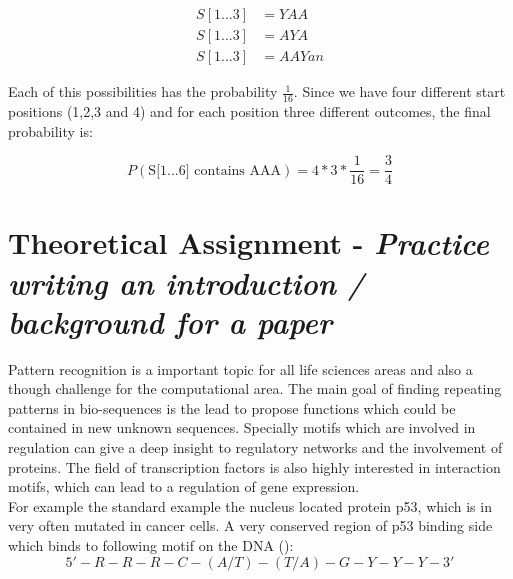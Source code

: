 \documentclass[%
   10pt,              %
   nenglish,           %
   a4paper,           %
   DIV11,             %
]{scrartcl}%
\begin{document}
\begin{align}
 S[1...3] &= YAA \nonumber \\
 S[1...3] &= AYA \nonumber \\
 S[1...3] &= AAY \nonumber an
\end{align}

\noindent Each of this possibilities has the probability $\frac{1}{16}$. Since we have four different 
start positions (1,2,3 and 4) and for each position three different outcomes, the final probability 
is:

\begin{equation}
 P(\textrm{S[1...6] contains AAA}) = 4 * 3 * \frac{1}{16} = \frac{3}{4} \nonumber
\end{equation}



\section*{Theoretical Assignment - \textsl{Practice writing an introduction / background for a paper}}

Pattern recognition is a important topic for all life sciences areas and also a though challenge for the computational area. The main goal of finding repeating patterns in bio-sequences is the lead to propose functions which could be contained in new unknown sequences. Specially motifs which are involved in regulation can give a deep insight to regulatory networks and the involvement of proteins. The field of transcription factors is also highly interested in interaction motifs, which can lead to a regulation of gene expression.\\
For example the standard example the nucleus located protein p53, which is in very often mutated in cancer cells. A very conserved region of p53 binding side which binds to following motif on the DNA (\cite{p53}):
\begin{equation*}
5'-R-R-R-C-(A/T)-(T/A)-G-Y-Y-Y-3'
\end{equation*}
\end{document}
